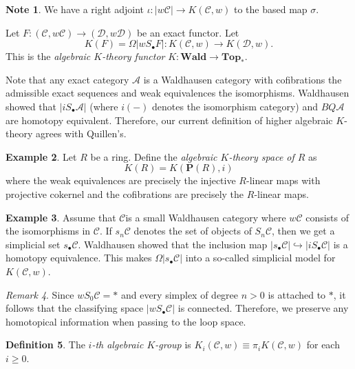\documentclass[10pt,letterpaper,cm]{nupset}
\theoremstyle{definition}
\newtheorem{definition}{Definition}
\newtheorem{exmp}[definition]{Example}
\newtheorem{note}[definition]{Note}
\theoremstyle{theorem}
\theoremstyle{remark}
\newtheorem{remark}[definition]{Remark}
\renewcommand{\P}{\mathbf P}
\newcommand{\1}{\mathbf{1}}
\renewcommand{\a}{\mathscr{A}}
\renewcommand{\c}{\mathscr{C}}
\renewcommand{\d}{\mathscr{D}}
\newcommand{\0}{\vec 0}
\begin{document}
\begin{note}
We have a right adjoint $\iota: \left\lvert{w{\c}}\right\rvert \to K(\c, w)$ to the based map $\sigma$.
\end{note}

\medskip


Let $F : \left(\c, w{\c}\right) \to \left(\d, w{\d}\right)$ be an exact functor. Let $$K(F) = \Omega\left\lvert{wS_{\bullet}F}\right\rvert : K(\c, w) \to K(\d, w).$$ This is the \textit{algebraic $K$-theory functor} $K : \mathbf{Wald} \to \mathbf{Top_{\ast}}.$

\medskip

Note that any exact category $\a$ is a Waldhausen category with cofibrations the admissible exact sequences and weak equivalences the isomorphisms. Waldhausen showed that $\left\lvert{i{S_{\bullet}\a}}\right\rvert$ (where $i({-})$ denotes the isomorphism category) and $BQ\a$ are homotopy equivalent. Therefore, our current definition of higher algebraic $K$-theory agrees with Quillen's.


\begin{exmp}
Let $R$ be a ring. Define the \textit{algebraic $K$-theory space of $R$} as $$K(R) = K(\P(R), i)$$ where the weak equivalences are precisely the injective $R$-linear maps with projective cokernel and the cofibrations are precisely the $R$-linear maps.
\end{exmp}

\begin{exmp}
Assume that $\c$is a small Waldhausen category where $w{\c}$ consists of the isomorphisms in $\c$. If $s_n\c$ denotes the set of objects of $S_n \c$, then we get a simplicial set $s_{\bullet} \c$. Waldhausen showed that the inclusion map $\left\lvert{s_{\bullet} \c}\right\rvert \hookrightarrow \left\lvert{iS_{\bullet} \c}\right\rvert$ is a homotopy equivalence. This makes $\Omega |s_{\bullet} \c|$ into a so-called simplicial model for $K(\c, w)$.
\end{exmp}

\begin{remark}
Since $wS_0 \c = \ast$ and every simplex of degree $n >0$ is attached to $\ast$, it follows that the classifying space $\left\lvert{w S_{\bullet} \c}\right\rvert$ is connected. Therefore, we preserve any homotopical information when passing to the loop space.
\end{remark}

\begin{definition}
The \textit{$i$-th algebraic $K$-group} is $K_i(\c, w) \equiv \pi_iK(\c, w)$ for each $i\geq 0$. 
\end{definition}
\end{document}
